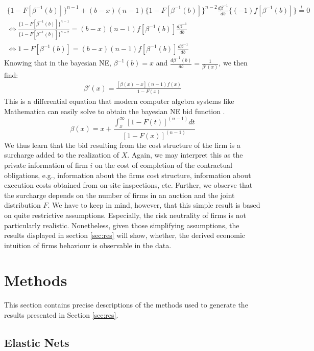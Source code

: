 \documentclass[a4paper,12pt, headsepline]{scrartcl}
\numberwithin{equation}{section}
\begin{document}
\begin{gather*}
\{1-F[\beta^{-1}(b)]\}^{n-1} + (b - x)(n - 		1)\{1-F[\beta^{-1}(b)]\}^{n-2}\frac{d\beta^{-1}}{db}\{(-1)f[\beta^{-1}(b)]\} \overset{!}{=} 0\\
	\iff \frac{\{1-F[\beta^{-1}(b)]\}^{n-1}}{\{1-F[\beta^{-1}(b)]\}^{n-2}} = (b - x)(n - 1)f[\beta^{-1}(b)]\frac{d\beta^{-1}}{db}\\
	\iff 1-F[\beta^{-1}(b)] = (b - x)(n - 1)f[\beta^{-1}(b)]\frac{d\beta^{-1}}{db}
\end{gather*}
Knowing that in the bayesian NE, $\beta^{-1}(b) = x$ and $\frac{d\beta^{-1}(b)}{db} = \frac{1}{\beta'(x)}$, we then find:
\begin{gather*}
	\beta'(x) = \frac{[\beta(x) - x](n - 1)f(x)}{1-F(x)}
\end{gather*}
This is a differential equation that modern computer algebra systems like Mathematica can easily solve to obtain the bayesian NE bid function \citep{mathematica}.
\[
\beta(x) = x + \frac{\int_x^\infty [1 - F(t)]^{(n-1)}dt}{[1-F(x)]^{(n-1)}}
\]
We thus learn that the bid resulting from the cost structure of the firm is a surcharge added to the realization of $X$. Again, we may interpret this as the private information of firm $i$ on the cost of completion of the contractual obligations, e.g., information about the firms cost structure, information about execution costs obtained from on-site inspections, etc. Further, we observe that the surcharge depends on the number of firms in an auction and the joint distribution $F$. We have to keep in mind, however, that this simple result is based on quite restrictive assumptions. Especially, the risk neutrality of firms is not particularly realistic. Nonetheless, given those simplifying assumptions, the results displayed in section \ref{sec:res} will show, whether, the derived economic intuition of firms behaviour is observable in the data.
\newpage
\section{Methods}\label{sec:meth}

This section contains precise descriptions of the methods used to generate the results presented in Section \ref{sec:res}.

\subsection{Elastic Nets}\label{subsec:net}
\end{document}
